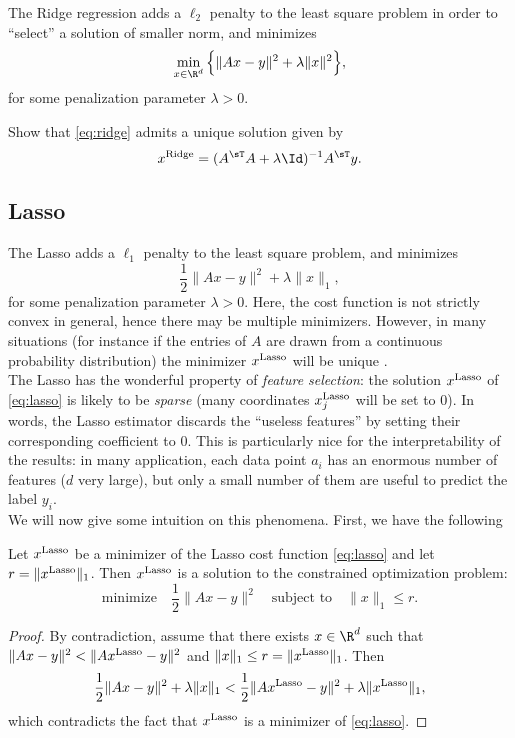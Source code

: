 \documentclass[11pt,nocut]{article}
\begin{document}
The Ridge regression adds a $\ell_2$ penalty to the least square problem in order to ``select'' a solution of smaller norm, and minimizes
\begin{equation}\label{eq:ridge}
	\min_{x \in \R^d} \Big\{ \| Ax - y \|^2 + \lambda \|x\|^2 \Big\},
\end{equation}
for some penalization parameter $\lambda >0$.
\begin{exercise}
	Show that \eqref{eq:ridge} admits a unique solution given by
	$$
	x^{\rm Ridge} = (A^{\sT} A + \lambda \Id)^{-1} A^{\sT} y.
	$$
\end{exercise}

\subsection{Lasso}\label{sec:lasso}

The Lasso adds a $\ell_1$ penalty to the least square problem, and minimizes
\begin{equation}\label{eq:lasso}
\frac{1}{2} \| Ax - y \|^2 + \lambda \|x\|_1,
\end{equation}
for some penalization parameter $\lambda >0$.
Here, the cost function is not strictly convex in general, hence there may be multiple minimizers. However, in many situations (for instance if the entries of $A$ are drawn from a continuous probability distribution) the minimizer $x^{\rm Lasso}$ will be unique \cite{tibshirani2013lasso}.
\\

The Lasso has the wonderful property of \emph{feature selection}: the solution $x^{\rm Lasso}$ of \eqref{eq:lasso} is likely to be \emph{sparse} (many coordinates $x^{\rm Lasso}_j$ will be set to $0$).
In words, the Lasso estimator discards the ``useless features'' by setting their corresponding coefficient to $0$. 
This is particularly nice for the interpretability of the results: in many application, each data point $a_i$ has an enormous number of features ($d$ very large), but only a small number of them are useful to predict the label $y_i$.
\\

We will now give some intuition on this phenomena. First, we have the following

\begin{lemma}\label{lem:ball}
	Let $x^{\rm Lasso}$ be a minimizer of the Lasso cost function \eqref{eq:lasso} and let $r=\|x^{\rm Lasso}\|_1$. Then $x^{\rm Lasso}$ is a solution to the constrained optimization problem:
	$$
	\text{minimize} \quad \frac{1}{2} \|Ax-y\|^2 \quad
	\text{subject to} \quad \|x\|_1 \leq r.
	$$
\end{lemma}
\begin{proof}
	By contradiction, assume that there exists $x \in \R^d$ such that $\|Ax -y\|^2 < \|Ax^{\rm Lasso}-y\|^2$ and $\|x\|_1 \leq r = \|x^{\rm Lasso}\|_1$. Then
	$$
\frac{1}{2} \| Ax - y \|^2 + \lambda \|x\|_1 
< 
\frac{1}{2} \| Ax^{\rm Lasso} - y \|^2 + \lambda \|x^{\rm Lasso}\|_1,
$$
which contradicts the fact that $x^{\rm Lasso}$ is a minimizer of \eqref{eq:lasso}.
\end{proof}
\\
\end{document}
